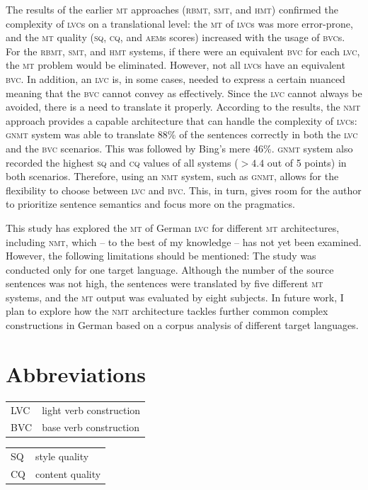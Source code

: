 \documentclass[output=paper]{langsci/langscibook}
\begin{document}
The results of the earlier \textsc{mt} approaches (\textsc{rbmt}, \textsc{smt}, and \textsc{hmt}) confirmed the complexity of \textsc{lvc}s on a translational level: the \textsc{mt} of \textsc{lvc}s was more error-prone, and the \textsc{mt} quality (\textsc{sq}, \textsc{cq}, and \textsc{aem}s scores) increased with the usage of \textsc{bvc}s. For the \textsc{rbmt}, \textsc{smt}, and \textsc{hmt} systems, if there were an equivalent \textsc{bvc} for each \textsc{lvc}, the \textsc{mt} problem would be eliminated. However, not all \textsc{lvc}s have an equivalent \textsc{bvc}. In addition, an \textsc{lvc} is, in some cases, needed to express a certain nuanced meaning that the \textsc{bvc} cannot convey as effectively. Since the \textsc{lvc} cannot always be avoided, there is a need to translate it properly. According to the results, the \textsc{nmt} approach provides a capable architecture that can handle the complexity of \textsc{lvc}s: \textsc{gnmt} system was able to translate 88\% of the sentences correctly in both the \textsc{lvc} and the \textsc{bvc} scenarios. This was followed by Bing’s mere 46\%. \textsc{gnmt} system also recorded the highest \textsc{sq} and \textsc{cq} values of all systems ($>4.4$ out of 5 points) in both scenarios. Therefore, using an \textsc{nmt} system, such as \textsc{gnmt}, allows for the flexibility to choose between \textsc{lvc} and \textsc{bvc}. This, in turn, gives room for the author to prioritize sentence semantics and focus more on the pragmatics.


This study has explored the \textsc{mt} of German \textsc{lvc} for different \textsc{mt} architectures, including \textsc{nmt}, which -- to the best of my knowledge -- has not yet been examined. However, the following limitations should be mentioned: The study was conducted only for one target language. Although the number of the source sentences was not high, the sentences were translated by five different \textsc{mt} systems, and the \textsc{mt} output was evaluated by eight subjects. In future work, I plan to explore how the \textsc{nmt} architecture tackles further common complex constructions in German based on a corpus analysis of different target languages.

\section*{Abbreviations}
\begin{tabularx}{.5\textwidth}{@{}lQ@{}}
\textsc{LVC}  & light verb construction\\
\textsc{BVC}  &base verb construction \\
\end{tabularx}%
\begin{tabularx}{.5\textwidth}{@{}lQ@{}}
\textsc{SQ} & style quality \\
\textsc{CQ}  & content quality\\
\end{tabularx}


{\sloppy\printbibliography[heading=subbibliography,notkeyword=this]}
\end{document}
